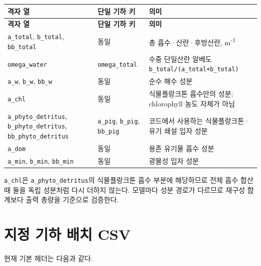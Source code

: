 {\TableFont
\begin{longtable}{@{}>{\raggedright\arraybackslash}p{}>{\raggedright\arraybackslash}p{}>{\raggedright\arraybackslash}p{}@{}}
\toprule
\textbf{격자 열} & \textbf{단일 기하 키} & \textbf{의미} \\
\midrule
\endfirsthead
\toprule
\textbf{격자 열} & \textbf{단일 기하 키} & \textbf{의미} \\
\midrule
\endhead
\bottomrule
\endfoot
\texttt{a\_\allowbreak{}total}, \texttt{b\_\allowbreak{}total}, \texttt{bb\_\allowbreak{}total} & 동일 & 총 흡수·산란·후방산란, m\textsuperscript{-}\textsuperscript{1} \\
\texttt{omega\_\allowbreak{}water} & \texttt{omega\_\allowbreak{}total} & 수중 단일산란 알베도 \texttt{b\_\allowbreak{}total/\allowbreak{}(a\_\allowbreak{}total+b\_\allowbreak{}total)} \\
\texttt{a\_\allowbreak{}w}, \texttt{b\_\allowbreak{}w}, \texttt{bb\_\allowbreak{}w} & 동일 & 순수 해수 성분 \\
\texttt{a\_\allowbreak{}chl} & 동일 & 식물플랑크톤 흡수만의 성분; chlorophyll 농도 자체가 아님 \\
\texttt{a\_\allowbreak{}phyto\_\allowbreak{}detritus}, \texttt{b\_\allowbreak{}phyto\_\allowbreak{}detritus}, \texttt{bb\_\allowbreak{}phyto\_\allowbreak{}detritus} & \texttt{a\_\allowbreak{}pig}, \texttt{b\_\allowbreak{}pig}, \texttt{bb\_\allowbreak{}pig} & 코드에서 사용하는 식물플랑크톤·유기 쇄설 입자 성분 \\
\texttt{a\_\allowbreak{}dom} & 동일 & 용존 유기물 흡수 성분 \\
\texttt{a\_\allowbreak{}min}, \texttt{b\_\allowbreak{}min}, \texttt{bb\_\allowbreak{}min} & 동일 & 광물성 입자 성분 \\
\end{longtable}
}

\texttt{a\_\allowbreak{}chl}은 \texttt{a\_\allowbreak{}phyto\_\allowbreak{}detritus}의 식물플랑크톤 흡수 부분에 해당하므로 전체 흡수 합산 때 둘을 독립 성분처럼 다시 더하지 않는다. 모델마다 성분 경로가 다르므로 재구성 합계보다 출력 총량을 기준으로 검증한다.

\section{지정 기하 배치 CSV}
\label{sec:auto:05_output_formats:8}
현재 기본 헤더는 다음과 같다.


